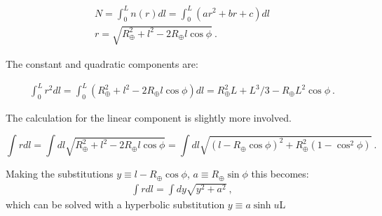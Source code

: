 \begin{align}
    N = \int_0^L n(r) dl = \int_0^L (a r^2 + b r + c) dl \\
    r = \sqrt{R_\oplus ^2 + l^2 - 2R_\oplus l \cos \phi}~.
\end{align}

The constant and quadratic components are:

\begin{align}
    \int_0^L r^2 dl = \int_0^L (R_\oplus ^2 + l^2 - 2R_\oplus l \cos \phi) dl = R_\oplus^2 L + L^3 /3 - R_\oplus L^2 \cos \phi~.
\end{align}

The calculation for the linear component is slightly more involved.

\begin{equation}  
\int r dl = \int dl \sqrt{R_\oplus ^2 + l^2 - 2R_\oplus l \cos \phi} =
    \int dl \sqrt{(l - R_\oplus \cos \phi)^2 + R_\oplus^2(1- \cos^2 \phi)}~.
    \end{equation}
    
Making the substitutions $  y \equiv l - R_\oplus \cos \phi$, $ a \equiv R_\oplus \sin \phi$ this becomes:
    \begin{align}
   \int r dl    =  \int dy \sqrt{y^2 + a^2} \nonumber~,
   \end{align}
   which can be solved with a hyperbolic substitution $y \equiv a \sinh u$L
   
